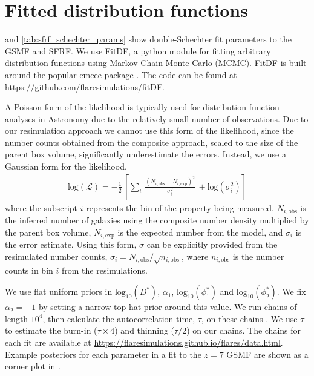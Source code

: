 \section{Fitted distribution functions}
 and \ref{tab:sfrf_schechter_params} show double-Schechter fit parameters to the GSMF and SFRF.
We use \textsf{FitDF}, a python module for fitting arbitrary distribution functions using Markov Chain Monte Carlo (MCMC).
\textsf{FitDF} is built around the popular \textsf{emcee} package \citep[v3.0,][]{foreman-mackey_emcee_2013}.
The code can be found at \url{https://github.com/flaresimulations/fitDF}.

A Poisson form of the likelihood is typically used for distribution function analyses in Astronomy due to the relatively small number of observations.
Due to our resimulation approach we cannot use this form of the likelihood, since the number counts obtained from the composite approach, scaled to the size of the parent box volume, significantly underestimate the errors.
Instead, we use a Gaussian form for the likelihood,
\begin{align}
\mathrm{log}(\mathcal{L}) = - \frac{1}{2} \, \left[ \sum_{i} \, \frac{ (N_{i,\mathrm{obs}} - N_{i,\mathrm{exp}})^2 }{\sigma_{i}^{2}} \, + \mathrm{log}(\sigma_{i}^{2}) \right]
\end{align}
where the subscript $i$ represents the bin of the property being measured, $N_{i,\mathrm{obs}}$ is the inferred number of galaxies using the composite number density multiplied by the parent box volume, $N_{i,\mathrm{exp}}$ is the expected number from the model, and $\sigma_i$ is the error estimate.
Using this form, $\sigma$ can be explicitly provided from the resimulated number counts, $\sigma_{i} = N_{i,\mathrm{obs}} / \sqrt{n_{i,\mathrm{obs}}}$, where $n_{i,\mathrm{obs}}$ is the number counts in bin $i$ from the resimulations.

We use flat uniform priors in $\mathrm{log_{10}}(D^*)$, $\alpha_1$, $\mathrm{log_{10}}(\phi^*_1)$ and $\mathrm{log_{10}}(\phi^*_2)$.
We fix $\alpha_2 = -1$ by setting a narrow top-hat prior around this value.
We run chains of length $10^{4}$, then calculate the autocorrelation time, $\tau$, on these chains \citep{goodman_ensemble_2010}.
We use $\tau$ to estimate the burn-in ($\tau \times 4$) and thinning ($\tau / 2$) on our chains.
The chains for each fit are available at \url{https://flaresimulations.github.io/flares/data.html}.
Example posteriors for each parameter in a fit to the $z = 7$ GSMF are shown as a corner plot in .

